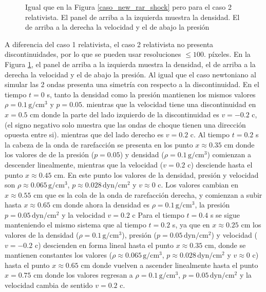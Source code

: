 \documentclass[12pt,a4paper]{book}
\begin{document}
\begin{figure}
    \caption{Igual que en la Figura \ref{caso_new_rar_shock} pero para el caso 2 relativista. 
    El panel de arriba a la izquierda muestra la densidad.
    El de arriba a la derecha la velocidad y el de abajo la presión}\label{caso_rel_shock_shock}
\end{figure}
A diferencia del caso 1 relativista, el caso 2 relativista no presenta discontinuidades,
por lo que se pueden usar resoluciones $\leq 100.$ píxeles. En la Figura 
\ref{caso_rel_shock_shock},  
el panel de arriba a la izquierda muestra la densidad, el de arriba a la derecha la velocidad
y el de abajo la presión.
Al igual que el caso newtoniano al simular las 2 ondas presenta una simetría con respecto a la 
discontinuidad.
En el tiempo $t = 0$ s, tanto la densidad como la presión mantienen los mismos valores 
$\rho =0.1 \,  \text{g}/ \text{cm}^3$
y $p = 0.05$. mientras que la velocidad tiene una discontinuidad en $x = 0.5$ cm donde la parte del lado
izquierdo de la discontinuidad es $v = -0.2$ c,  (el signo negativo solo muestra que las ondas de choque
tienen una dirección opuesta entre si). 
mientras que del lado derecho es $v = 0.2$ c.
Al tiempo $t = 0.2$ s la cabeza de la onda de rarefacción se presenta en los punto 
$x \approx 0.35$ cm donde los valores de de la presión ($p = 0.05$) y densidad 
($\rho =0.1 \,  \text{g}/ \text{cm}^3$) comienzan a descender linealmente,
mientras que la velocidad ($v = 0.2$ c) desciende hasta el punto $x \approx 0.45$ cm. En este punto los valores de la densidad, presión y velocidad
son $\rho \approx 0.065 \,  \text{g}/ \text{cm}^3$, $p \approx 0.028\,  \text{dyn}/ \text{cm}^2 $ 
y $v \approx 0$ c. Los valores cambian en 
$ x \approx 0.55$ cm
que es la cola de la onda de rarefacción derecha, y comienzan a subir
hasta $x \approx 0.65$ cm donde ahora la densidad es 
$\rho = 0.1 \,  \text{g}/ \text{cm}^3$, la presión $p = 0.05 \,  \text{dyn}/ \text{cm}^2 $ y 
la velocidad $v = 0.2$ c
Para el tiempo $t = 0.4$ s se sigue manteniendo el mismo sistema que al tiempo $t =0.2$ s, ya que en
$x \approx 0.25$ cm los valores de la densidad ($\rho = 0.1 \,  \text{g}/ \text{cm}^3$), 
presión ($p = 0.05 \,  \text{dyn}/ \text{cm}^2 $) 
y velocidad ($v = -0.2$ c) descienden en forma lineal hasta el punto $x \approx 0.35$ cm, donde 
se mantienen constantes los valores ($\rho \approx 0.065  \,  \text{g}/ \text{cm}^3$, 
$p \approx 0.028\,  \text{dyn}/ \text{cm}^2 $ y $v \approx 0$ c) 
hasta el punto $x \approx 0.65$ cm donde vuelven a ascender linealmente
hasta el punto $x = 0.75$ cm donde los valores regresan a $\rho = 0.1 \,  \text{g}/ \text{cm}^3$, 
$p = 0.05 \,  \text{dyn}/ \text{cm}^2 $ y la velocidad 
cambia de sentido $v = 0.2$ c.
\end{document}

